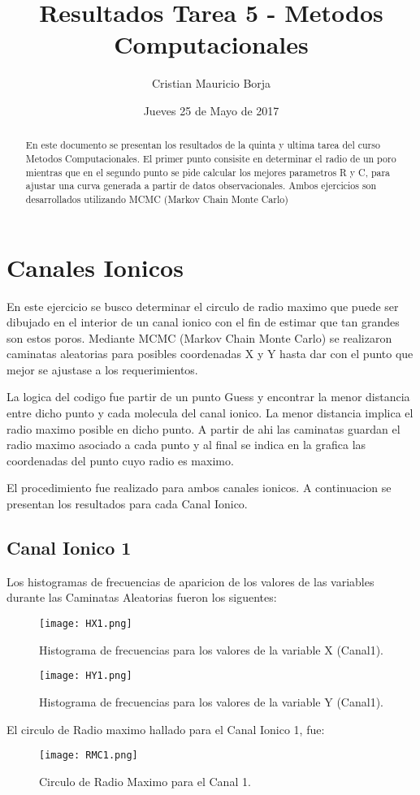 \documentclass[9pt]{article}
\author{Cristian Mauricio Borja}
\date{Jueves 25 de Mayo de 2017}
\title{\textbf{Resultados Tarea 5 - Metodos Computacionales}}
\begin{document}
\maketitle

\begin{abstract}
En este documento se presentan los resultados de la quinta y ultima tarea del curso Metodos Computacionales. El primer punto consisite en determinar el radio de un poro mientras que en el segundo punto se pide calcular los mejores parametros R y C, para ajustar una curva generada a partir de datos observacionales. Ambos ejercicios son desarrollados utilizando MCMC (Markov Chain Monte Carlo)
\end{abstract}

\section{Canales Ionicos}
En este ejercicio se busco determinar el circulo de radio maximo que puede ser dibujado en el interior de un canal ionico con el fin de estimar que tan grandes son estos poros. Mediante MCMC (Markov Chain Monte Carlo) se realizaron caminatas aleatorias para posibles coordenadas X y Y hasta dar con el punto que mejor se ajustase a los requerimientos. 

La logica del codigo fue partir de un punto Guess y encontrar la menor distancia entre dicho punto y cada molecula del canal ionico. La menor distancia implica el radio maximo posible en dicho punto. A partir de ahi las caminatas guardan el radio maximo asociado a cada punto y al final se indica en la grafica las coordenadas del punto cuyo radio es maximo.

El procedimiento fue realizado para ambos canales ionicos. A continuacion se presentan los resultados para cada Canal Ionico.


\subsection{Canal Ionico 1}

Los histogramas de frecuencias de aparicion de los valores de las variables durante las Caminatas Aleatorias fueron los siguentes:
	\begin{figure}[h]
		\centering
			\texttt{[image: HX1.png]}
		\caption{Histograma de frecuencias para los valores de la variable X (Canal1).}
		\label{fig:HX1}
	\end{figure}

	\begin{figure}[h]
		\centering
			\texttt{[image: HY1.png]}
		\caption{Histograma de frecuencias para los valores de la variable Y (Canal1).}
		\label{fig:HY1}
	\end{figure}
El circulo de Radio maximo hallado para el Canal Ionico 1, fue:
	\begin{figure}[h]
		\centering
			\texttt{[image: RMC1.png]}
		\caption{Circulo de Radio Maximo para el Canal 1.}
		\label{fig:RMC1}
	\end{figure}
\end{document}
